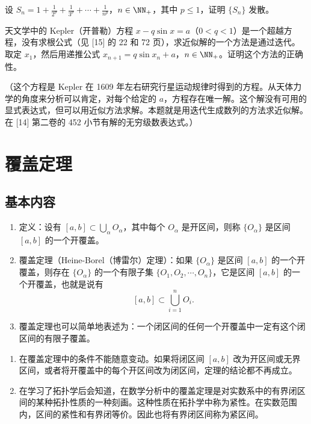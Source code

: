 \begin{xexercise}[6]
设 $S_n=1+\frac1{2^p}+\frac1{3^p}+\cdots+\frac1{n^p}$，$n\in\NN_+$，其中 $p\leqslant1$，证明 $\{S_n\}$ 发散。
\end{xexercise}

\begin{xexercise}[7]
天文学中的 Kepler（开普勒）方程 $x-q\sin x=a$（$0<q<1$）是一个超越方程，没有求根公式（见 [15] 的 22 和 72 页），求近似解的一个方法是通过迭代。取定 $x_1$，然后用递推公式 $x_{n+1}=q\sin x_n+a$，$n\in\NN_+$。证明这个方法的正确性。

  （这个方程是 Kepler 在 1609 年左右研究行星运动规律时得到的方程。从天体力学的角度来分析可以肯定，对每个给定的 $a$，方程存在唯一解。这个解没有可用的显式表达式，但可以用近似方法求解。本题就是用迭代生成数列的方法求近似解。在 [14] 第二卷的 452 小节有解的无穷级数表达式。）
\end{xexercise}

\section{覆盖定理}

\subsection{基本内容}

\begin{enumerate}
  \item 定义：设有 $[a,b]\subset\bigcup_{\alpha}O_{\alpha}$，其中每个 $O_{\alpha}$ 是开区间，则称 $\{O_{\alpha}\}$ 是区间 $[a,b]$ 的一个开覆盖。
  \item 覆盖定理（Heine-Borel（博雷尔）定理）：如果 $\{O_{\alpha}\}$ 是区间 $[a,b]$ 的一个开覆盖，则存在 $\{O_{\alpha}\}$ 的一个有限子集 $\{O_1,O_2,\cdots,O_n\}$，它是区间 $[a,b]$ 的一个开覆盖，也就是说有
  \[
    [a,b]\subset\bigcup_{i=1}^{n}O_i.
  \]
  \item 覆盖定理也可以简单地表述为：一个闭区间的任何一个开覆盖中一定有这个闭区间的有限子覆盖。
\end{enumerate}
  \begin{enumerate}[start=4]
    \item 在覆盖定理中的条件不能随意变动。如果将闭区间 $[a,b]$ 改为开区间或无界区间，或者将开覆盖中的每个开区间改为闭区间，定理的结论都不再成立。
    \item 在学习了拓扑学后会知道，在数学分析中的覆盖定理是对实数系中的有界闭区间的某种拓扑性质的一种刻画。这种性质在拓扑学中称为紧性。在实数范围内，区间的紧性和有界闭等价。因此也将有界闭区间称为紧区间。
  \end{enumerate}

